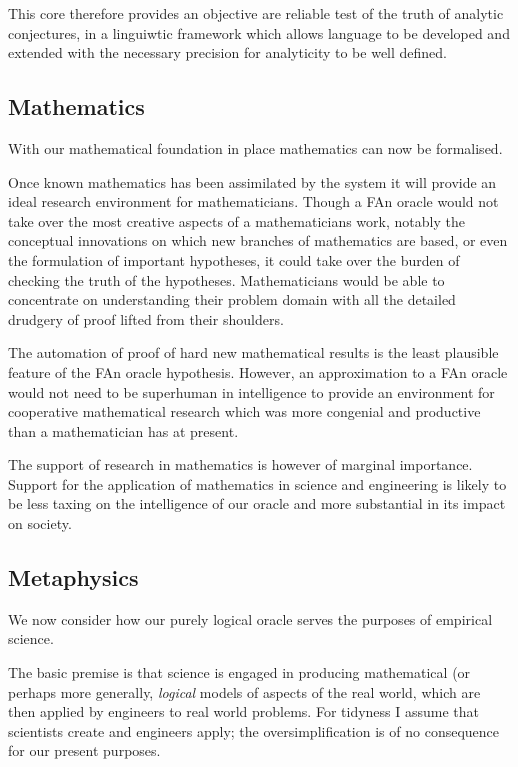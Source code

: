This core therefore provides an objective are reliable test of the truth of analytic conjectures, in a linguiwtic framework which allows language to be developed and extended with the necessary precision for analyticity to be well defined.

\subsection{Mathematics}

With our mathematical foundation in place mathematics can now be formalised.

Once known mathematics has been assimilated by the system it will provide an ideal research environment for mathematicians.
Though a FAn oracle would not take over the most creative aspects of a mathematicians work, notably the conceptual innovations on which new branches of mathematics are based, or even the formulation of important hypotheses, it could take over the burden of checking the truth of the hypotheses.
Mathematicians would be able to concentrate on understanding their problem domain with all the detailed drudgery of proof lifted from their shoulders.

The automation of proof of hard new mathematical results is the least plausible feature of the FAn oracle hypothesis.
However, an approximation to a FAn oracle would not need to be superhuman in intelligence to provide an environment for cooperative mathematical research which was more congenial and productive than a mathematician has at present.

The support of research in mathematics is however of marginal importance.
Support for the application of mathematics in science and engineering is likely to be less taxing on the intelligence of our oracle and more substantial in its impact on society.

\subsection{Metaphysics}

We now consider how our purely logical oracle serves the purposes of empirical science.

The basic premise is that science is engaged in producing mathematical (or perhaps more generally, {\it logical} models of aspects of the real world, which are then applied by engineers to real world problems.
For tidyness I assume that scientists create and engineers apply; the oversimplification is of no consequence for our present purposes.

